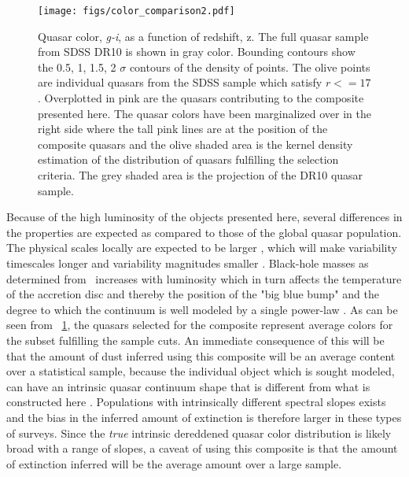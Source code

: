 \documentclass{aa}    %
\newcommand{\figref}[1]{\ref{fig:#1}}
\newcommand{\Fig}[1]{\figurename~\figref{#1}}
\newcommand{\fig}[1]{\Fig{#1}}
\newcommand{\figlabel}[1]{\label{fig:#1}}
\newcommand{\mgii}{\ion{Mg}{ii}}
\begin{document}
 \begin{figure}[t!]
   \centering
   \texttt{[image: figs/color\_comparison2.pdf]}
   \caption[]{Quasar color, \textit{g-i},  as a function of redshift, z. The
full quasar sample from SDSS DR10 \citep{Paris2014} is shown in gray color.
Bounding contours show the 0.5, 1, 1.5, 2 $\sigma$ contours of the density of
points. The olive points are individual quasars from the SDSS sample which
satisfy $r <= 17$. Overplotted in pink are the quasars contributing to the
composite presented here. The quasar colors have been marginalized over in the
right side where the tall pink lines are at the position of the composite
quasars and the olive shaded area is the kernel density estimation of the
distribution of quasars fulfilling the selection criteria. The grey shaded area
is the projection of the DR10 quasar sample.}
  \figlabel{color_comparison}
 \end{figure}

Because of the high luminosity of the objects presented here, several
differences in the properties are expected as compared to those of the
global quasar population. The physical scales locally are expected to
be larger \citep{Bentz2013}, which will make variability timescales
longer and variability magnitudes smaller \citep{VandenBerk2004,
  Schmidt2012}. Black-hole masses as determined from \mgii~increases
with luminosity \citep{wu2015} which in turn affects the temperature
of the accretion disc \citep{shakura1973, Pereyra2006} and thereby the
position of the "big blue bump" and the degree to which the continuum
is well modeled by a single power-law \citep[see also][for a
  discussion]{Lusso2015}. As can be seen from \fig{color_comparison},
the quasars selected for the composite represent average colors for
the subset fulfilling the sample cuts. An immediate consequence of
this will be that the amount of dust inferred using this composite
will be an average content over a statistical sample, because the
individual object which is sought modeled, can have an intrinsic
quasar continuum shape that is different from what is constructed here
\citep{Richards2003, Hopkins2004a}. Populations with intrinsically
different spectral slopes exists \citep{Glikman2012, Krawczyk2015} and
the bias in the inferred amount of extinction is therefore larger in
these types of surveys. Since the \textit{true} intrinsic dereddened
quasar color distribution is likely broad with a range of slopes, a
caveat of using this composite is that the amount of extinction
inferred will be the average amount over a large sample.
\end{document}
